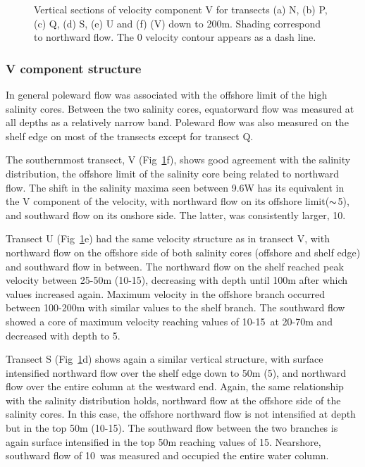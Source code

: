 \begin{figure}[!th]
\centering {}%
 
 
\caption{Vertical sections of
velocity component V for transects (a) N, (b) P, (c) Q, (d) S, (e)
U and (f) (V) down to 200m. Shading correspond to northward flow.
The 0 velocity contour appears as a dash line.}
\label{fig:cd105_sec_V}\end{figure}
\subsubsection{V component structure}
In general poleward flow was associated with the offshore limit of
the high salinity cores. Between the two salinity cores,
equatorward flow was measured at all depths as a relatively narrow
band. Poleward flow was also measured on the shelf edge on most of
the transects except for transect Q.

The southernmost transect, V (Fig~\ref{fig:cd105_sec_V}f), shows
good agreement with the salinity distribution, the offshore limit
of the salinity core being related to northward flow. The shift in
the salinity maxima seen between 9.6\deg W has its
equivalent in the V component of the velocity, with northward flow
on its offshore limit($\thicksim$5\velc), and southward flow on
its onshore side. The latter, was consistently larger, 10\velc.

Transect U (Fig~\ref{fig:cd105_sec_V}e) had the same velocity
structure as in transect V, with northward flow on the offshore
side of both salinity cores (offshore and shelf edge) and
southward flow in between. The northward flow on the shelf reached
peak velocity between 25-50m (10-15\velc), decreasing with depth
until 100m after which values increased again. Maximum velocity in
the offshore branch occurred between 100-200m with similar values
to the shelf branch. The southward flow showed a core of maximum
velocity reaching values of 10-15\velc\, at 20-70m and decreased
with depth to 5\velc.

Transect S (Fig~\ref{fig:cd105_sec_V}d) shows again a similar
vertical structure, with surface intensified northward flow over
the shelf edge down to 50m (5\velc), and northward flow over the
entire column at the westward end. Again, the same relationship
with the salinity distribution holds, northward flow at the
offshore side of the salinity cores. In this case, the offshore
northward flow is not intensified at depth but in the top 50m
(10-15\velc). The southward flow between the two branches is again
surface intensified in the top 50m reaching values of 15\velc.
Nearshore, southward flow of 10\velc\, was measured and occupied
the entire water column.

